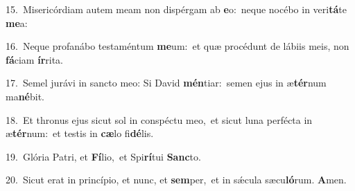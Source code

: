 {\numbfont\textcolor{\numbcolor}{15.}}~Misericórdiam autem meam non dispérgam ab \textbf{e}\-o:~\star neque nocébo in veri\-\textbf{tá}\-te \textbf{me}\-a:\par
{\numbfont\textcolor{\numbcolor}{16.}}~Neque profanábo testaméntum \textbf{me}\-um:~\star et quæ procédunt de lábiis meis, non \textbf{fá}\-ciam \textbf{ír}\-rita.\par
{\numbfont\textcolor{\numbcolor}{17.}}~Semel jurávi in sancto meo: Si David \textbf{mén}\-tiar:~\star semen ejus in æ\-\textbf{tér}\-num ma\-\textbf{né}\-bit.\par
{\numbfont\textcolor{\numbcolor}{18.}}~Et thronus ejus sicut sol in conspéctu meo,~\dagger et sicut luna perfécta in æ\-\textbf{tér}\-num:~\star et testis in \textbf{cæ}\-lo fi\-\textbf{dé}\-lis.\par
{\numbfont\textcolor{\numbcolor}{19.}}~Glória Patri, et \textbf{Fí}\-lio,~\star et Spi\-\textbf{rí}\-tui \textbf{Sanc}\-to.\par
{\numbfont\textcolor{\numbcolor}{20.}}~Sicut erat in princípio, et nunc, et \textbf{sem}\-per,~\star et in sǽcula sæcu\-\textbf{ló}\-rum. \textbf{A}\-men.\par
